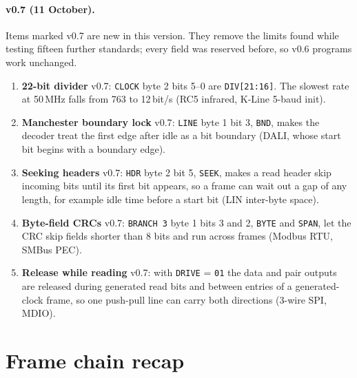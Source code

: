 \documentclass[11pt,a4paper]{article}
\newcommand{\vseven}{\textcolor{sevenc}{\textsf{\small v0.7}}}
\newcommand{\sig}[1]{\texttt{#1}}
\begin{document}
\paragraph{v0.7 (11 October).} Items marked \vseven{} are new in this version. They remove the limits found while testing fifteen further standards; every field was reserved before, so v0.6 programs work unchanged.
\begin{enumerate}
\item \textbf{22-bit divider} \vseven: \sig{CLOCK} byte 2 bits 5--0 are \sig{DIV[21:16]}. The slowest rate at 50\,MHz falls from 763 to 12\,bit/s (RC5 infrared, K-Line 5-baud init).
\item \textbf{Manchester boundary lock} \vseven: \sig{LINE} byte 1 bit 3, \sig{BND}, makes the decoder treat the first edge after idle as a bit boundary (DALI, whose start bit begins with a boundary edge).
\item \textbf{Seeking headers} \vseven: \sig{HDR} byte 2 bit 5, \sig{SEEK}, makes a read header skip incoming bits until its first bit appears, so a frame can wait out a gap of any length, for example idle time before a start bit (LIN inter-byte space).
\item \textbf{Byte-field CRCs} \vseven: \sig{BRANCH 3} byte 1 bits 3 and 2, \sig{BYTE} and \sig{SPAN}, let the CRC skip fields shorter than 8 bits and run across frames (Modbus RTU, SMBus PEC).
\item \textbf{Release while reading} \vseven: with \sig{DRIVE} = \texttt{01} the data and pair outputs are released during generated read bits and between entries of a generated-clock frame, so one push-pull line can carry both directions (3-wire SPI, MDIO).
\end{enumerate}

\section{Frame chain recap}

\begin{center}
\end{center}
\end{document}
